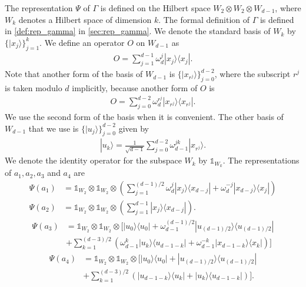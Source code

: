 \documentclass[11pt,letterpaper]{article}
\newcommand{\ket}[1]{|#1\rangle}
\newcommand{\ketbra}[2]{|#1\rangle\langle#2|}
\newcommand{\x}{\otimes}
\newcommand{\1}{\mathbb{1}}
\theoremstyle{definition}
\begin{document}
The representation $\Psi$ of $\Gamma$ is defined on the Hilbert space
$W_2 \x W_2 \x W_{d-1}$,
where $W_k$ denotes a Hilbert space of
dimension $k$. 
The formal definition of $\Gamma$ is defined in \cref{def:rep_gamma}
in \cref{sec:rep_gamma}.
We denote the
standard basis of $W_k$ by $\{\ket{x_j}\}_{j=1}^{k}$.
We define an operator $O$ on $W_{d-1}$ as
\begin{align*}
    O = \sum_{j=1}^{d-1} \omega_d^j \ketbra{x_j}{x_j}.
\end{align*}
Note that another form of the basis of $W_{d-1}$ is $\{\ket{x_{r^j}}\}_{j=0}^{d-2}$, 
where the subscript $r^j$ is taken modulo $d$ implicitly,
because another form of $O$ is 
\begin{align}
    \label{eq:O}
    O = \sum_{j=0}^{d-2} \omega_d^{r^j} \ketbra{x_{r^j}}{x_{r^j}}.
\end{align}
We use the second form of the basis when it is convenient.
The other basis of $W_{d-1}$ that we use is $\{ \ket{u_j} \}_{j=0}^{d-2}$ given by
\begin{align*}
	\ket{u_k} = \frac{1}{\sqrt{d-1}} \sum_{j=0}^{d-2} \omega_{d-1}^{jk} \ket{x_{r^j}}.
\end{align*}
We denote the identity operator for the subspace $W_k$ by $\1_{W_k}$.
The representations of $a_1, a_2, a_3$ and $a_4$ are 
\begin{align}
    \label{eq:o1} \Psi(a_1) &= \1_{W_2} \x \1_{W_2} \x \left(\sum_{j=1}^{(d-1)/2} \omega_d^j \ketbra{x_j}{x_{d-j}} + \omega_d^{-j} \ketbra{x_{d-j}}{x_{j}}\right) \\
    \label{eq:o2} \Psi(a_2) &= \1_{W_2} \x \1_{W_2} \x \left(\sum_{j=1}^{d-1} \ketbra{x_j}{x_{d-j}} \right).
\end{align}
\begin{equation}
    \begin{aligned}
    \label{eq:u1} \Psi(a_3) &= \1_{W_2} \x \1_{W_2} \x \Big[\ketbra{u_0}{u_0} +\omega_{d-1}^{(d-1)/2}\ketbra{u_{(d-1)/2}}{u_{(d-1)/2}}\\ 
    &+ \sum_{k=1}^{(d-3)/2}\left( \omega_{d-1}^k\ketbra{u_k}{u_{d-1-k}} + \omega_{d-1}^{-k}\ketbra{x_{d-1-k}}{x_k}\right) \Big]
    \end{aligned}
\end{equation}
\begin{equation}
    \begin{aligned}
    \label{eq:u2}\Psi(a_4) &= \1_{W_2} \x \1_{W_2} \x \Big[\ketbra{u_0}{u_0} +\ketbra{u_{(d-1)/2}}{u_{(d-1)/2}} \\
	& + \sum_{k=1}^{(d-3)/2}\left(\ketbra{u_{d-1-k}}{u_k} + \ketbra{u_k}{u_{d-1-k}}\right)\Big].
    \end{aligned}
\end{equation}
\end{document}
